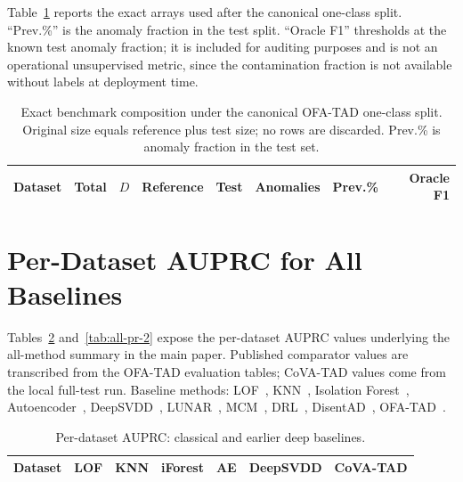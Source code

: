 \documentclass{article}
\begin{document}
Table~\ref{tab:composition} reports the exact arrays used after the canonical one-class split. ``Prev.\%'' is the anomaly fraction in the test split. ``Oracle F1'' thresholds at the known test anomaly fraction; it is included for auditing purposes and is not an operational unsupervised metric, since the contamination fraction is not available without labels at deployment time.

\begin{table}[h]
\centering
\caption{Exact benchmark composition under the canonical OFA-TAD one-class split. Original size equals reference plus test size; no rows are discarded. Prev.\% is anomaly fraction in the test set.}
\label{tab:composition}
\small
\setlength{\tabcolsep}{5pt}
\begin{tabular}{lrrrrrrr}
\toprule
Dataset & Total & $D$ & Reference & Test & Anomalies & Prev.\% & Oracle F1\\
\midrule
%
\end{tabular}
\end{table}

\section{Per-Dataset AUPRC for All Baselines}
\label{app:all-pr}

Tables~\ref{tab:all-pr-1} and~\ref{tab:all-pr-2} expose the per-dataset AUPRC values underlying the all-method summary in the main paper. Published comparator values are transcribed from the OFA-TAD evaluation tables; CoVA-TAD values come from the local full-test run. Baseline methods: LOF~\citep{breunig2000lof}, KNN~\citep{ramaswamy2000knn}, Isolation Forest~\citep{liu2008isolation}, Autoencoder~\citep{sakurada2014autoencoder}, DeepSVDD~\citep{ruff2018deep}, LUNAR~\citep{goodge2022lunar}, MCM~\citep{yin2024mcm}, DRL~\citep{ye2025drl}, DisentAD~\citep{ye2025disentad}, OFA-TAD~\citep{li2026towards}.

\begin{table}[h]
\centering
\caption{Per-dataset AUPRC: classical and earlier deep baselines.}
\label{tab:all-pr-1}
\small
\setlength{\tabcolsep}{4.5pt}
\begin{tabular}{lrrrrrr}
\toprule
Dataset & LOF & KNN & iForest & AE & DeepSVDD & CoVA-TAD\\
\midrule
%
\end{tabular}
\end{table}
\end{document}
